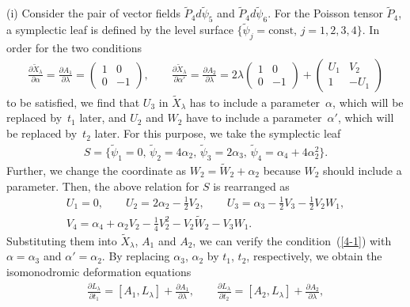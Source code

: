 \documentclass[pdftex]{sigma}
\numberwithin{equation}{section}
\begin{document}
(i) Consider the pair of vector f\/ields $\widetilde{P}_4 d\widetilde{\psi}_5$ and $\widetilde{P}_4 d\widetilde{\psi}_6$. For the Poisson tensor $\widetilde{P}_4$, a symplectic leaf is def\/ined by the level surface
$\{ \widetilde{\psi}_j = \text{const},\, j=1,2,3,4\}$.
In order for the two conditions
\begin{gather}
\frac{\partial \widetilde{X}_\lambda }{\partial \alpha } = \frac{\partial A_1 }{\partial \lambda } = \left(
\begin{matrix}
1 & 0 \\
0 & -1
\end{matrix}
\right), \qquad
\frac{\partial \widetilde{X}_\lambda }{\partial \alpha' } = \frac{\partial A_2 }{\partial \lambda } = 2\lambda \left(
\begin{matrix}
1 & 0 \\
0 & -1
\end{matrix}
\right) + \left(
\begin{matrix}
U_1 & V_2 \\
1 & -U_1
\end{matrix}
\right)
\label{4-1}
\end{gather}
to be satisf\/ied, we f\/ind that $U_3$ in $\widetilde{X}_\lambda $ has to include a parameter~$\alpha $, which will be replaced by~$t_1$ later,
and $U_2$ and $W_2$ have to include a parameter~$\alpha' $, which will be replaced by~$t_2$ later. For this purpose, we take the symplectic leaf
\begin{gather*}
S = \big\{ \widetilde{\psi}_1 = 0,\, \widetilde{\psi}_2 = 4\alpha _2 ,\, \widetilde{\psi}_3 = 2\alpha _3,\,
\widetilde{\psi}_4 = \alpha _4 + 4\alpha _2^2 \big\}.
\end{gather*}
Further, we change the coordinate as $W_2 = \widetilde{W}_2 + \alpha _2$ because $W_2$ should include a parameter. Then, the above relation for $S$ is rearranged as
\begin{gather*}
 U_1 = 0,\qquad U_2 = 2\alpha _2-\frac{1}{2}V_2,\qquad U_3 = \alpha _3-\frac{1}{2}V_3-\frac{1}{2}V_2W_1, \\
 V_4 = \alpha _4 + \alpha _2V_2 - \frac{1}{4}V_2^2 - V_2\widetilde{W}_2 - V_3W_1.
\end{gather*}
Substituting them into $\widetilde{X}_\lambda$, $A_1$ and $A_2$, we can verify the condition~(\ref{4-1}) with $\alpha = \alpha _3$ and $\alpha ' = \alpha _2$. By replacing $\alpha _3$, $\alpha _2$ by $t_1$, $t_2$, respectively, we obtain the isomonodromic deformation equations
\begin{gather}
\frac{\partial L_\lambda }{\partial t_1} = [A_1, L_\lambda ]+ \frac{\partial A_1}{\partial \lambda }, \qquad
\frac{\partial L_\lambda }{\partial t_2} = [A_2, L_\lambda ]+ \frac{\partial A_2}{\partial \lambda },
\label{PDE}
\end{gather}
\end{document}
